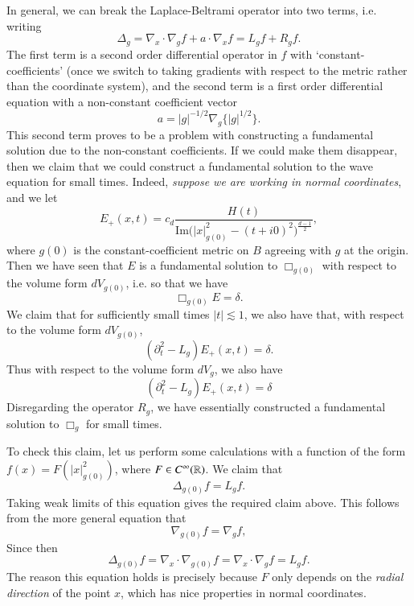 In general, we can break the Laplace-Beltrami operator into two terms, i.e. writing
%
\[ \Delta_g = \nabla_x \cdot \nabla_g f + a \cdot \nabla_x f = L_g f + R_g f. \]
%
The first term is a second order differential operator in $f$ with `constant-coefficients' (once we switch to taking gradients with respect to the metric rather than the coordinate system), and the second term is a first order differential equation with a non-constant coefficient vector
%
\[ a = |g|^{-1/2} \nabla_g \{ |g|^{1/2} \}. \]
%
This second term proves to be a problem with constructing a fundamental solution due to the non-constant coefficients. If we could make them disappear, then we claim that we could construct a fundamental solution to the wave equation for small times. Indeed, \emph{suppose we are working in normal coordinates}, and we let
%
\[ E_+(x,t) = c_d \frac{H(t)}{\text{Im} \Big(|x|^2_{g(0)} - (t + i0)^2 \Big)^{\frac{d-1}{2}}}, \]
%
where $g(0)$ is the constant-coefficient metric on $B$ agreeing with $g$ at the origin. Then we have seen that $E$ is a fundamental solution to $\Box_{g(0)}$ with respect to the volume form $dV_{g(0)}$, i.e. so that we have
%
\[ \Box_{g(0)} E = \delta. \]
%
We claim that for sufficiently small times $|t| \lesssim 1$, we also have that, with respect to the volume form $dV_{g(0)}$,
%
\[ (\partial_t^2 - L_g) E_+(x,t) = \delta. \]
%
Thus with respect to the volume form $dV_g$, we also have
%
\[ (\partial_t^2 - L_g) E_+(x,t) = \delta \]
%
Disregarding the operator $R_g$, we have essentially constructed a fundamental solution to $\Box_g$ for small times.

To check this claim, let us perform some calculations with a function of the form $f(x) = F(|x|^2_{g(0)})$, where $F \in C^\infty(\operatorname{\mathbb{R}})$. We claim that
%
\[ \Delta_{g(0)} f = L_g f. \]
%
Taking weak limits of this equation gives the required claim above. This follows from the more general equation that
%
\[ \nabla_{g(0)} f = \nabla_g f, \]
%
Since then
%
\[ \Delta_{g(0)} f = \nabla_x \cdot \nabla_{g(0)} f = \nabla_x \cdot \nabla_g f = L_g f. \]
%
The reason this equation holds is precisely because $F$ only depends on the \emph{radial direction} of the point $x$, which has nice properties in normal coordinates.


